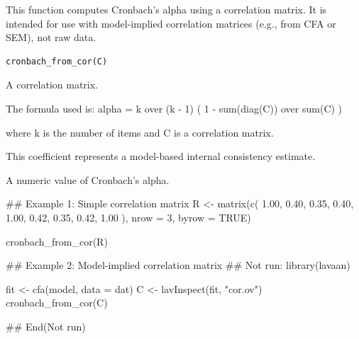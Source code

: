 \documentclass[a4paper]{book}
\begin{document}
%
\begin{Description}
This function computes Cronbach's alpha using a correlation matrix.
It is intended for use with model-implied correlation matrices
(e.g., from CFA or SEM), not raw data.
\end{Description}
%
\begin{Usage}
\begin{verbatim}
cronbach_from_cor(C)
\end{verbatim}
\end{Usage}
%
\begin{Arguments}
\begin{ldescription}
\item[\code{C}] A correlation matrix.
\end{ldescription}
\end{Arguments}
%
\begin{Details}
The formula used is:
alpha = k over (k - 1) ( 1 - sum(diag(C)) over sum(C) )

where k is the number of items and C is a correlation matrix.

This coefficient represents a model-based internal consistency estimate.
\end{Details}
%
\begin{Value}
A numeric value of Cronbach's alpha.
\end{Value}
%
\begin{Examples}
\begin{ExampleCode}
## Example 1: Simple correlation matrix
R <- matrix(c(
  1.00, 0.40, 0.35,
  0.40, 1.00, 0.42,
  0.35, 0.42, 1.00
), nrow = 3, byrow = TRUE)

cronbach_from_cor(R)

## Example 2: Model-implied correlation matrix
\#\# Not run: 
library(lavaan)

fit <- cfa(model, data = dat)
C <- lavInspect(fit, "cor.ov")
cronbach_from_cor(C)

## End(Not run)

\end{ExampleCode}
\end{Examples}
\end{document}
